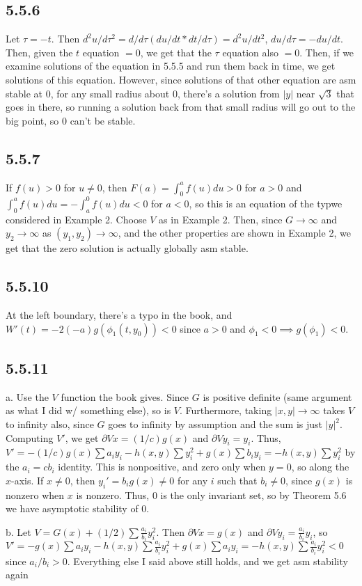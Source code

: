 \documentclass{article}
\begin{document}
\subsection*{5.5.6}
Let $\tau=-t$. Then $d^2u/d\tau^2=d/d\tau(du/dt*dt/d\tau)=d^2u/dt^2$, $du/d\tau=-du/dt$. Then, given the $t$ equation $=0$, we get that the $\tau$ equation also $=0$. Then, if we examine solutions of the equation in 5.5.5 and run them back in time, we get solutions of this equation. However, since solutions of that other equation are asm stable at $0$, for any small radius about $0$, there's a solution from $|y|$ near $\sqrt{3}$ that goes in there, so running a solution back from that small radius will go out to the big point, so $0$ can't be stable.
\subsection*{5.5.7}
If $f(u)>0$ for $u\neq0$, then $F(a)=\int_0^af(u)du>0$ for $a>0$ and $\int_0^af(u)du=-\int_a^0f(u)du<0$ for $a<0$, so this is an equation of the typwe considered in Example 2. Choose $V$ as in Example 2. Then, since $G\to\infty$ and $y_2\to\infty$ as $(y_1,y_2)\to\infty$, and the other properties are shown in Example 2, we get that the zero solution is actually globally asm stable.
\subsection*{5.5.10}
At the left boundary, there's a typo in the book, and $W'(t)=-2(-a)g(\phi_1(t,y_0))<0$ since $a>0$ and $\phi_1<0\implies g(\phi_1)<0$.
\subsection*{5.5.11}
a. Use the $V$ function the book gives. Since $G$ is positive definite (same argument as what I did w/ something else), so is $V$. Furthermore, taking $|x,y|\to\infty$ takes $V$ to infinity also, since $G$ goes to infinity by assumption and the sum is just $|y|^2$. Computing $V'$, we get $\partial{V}{x}=(1/c)g(x)$ and $\partial{V}{y_i}=y_i$. Thus, $V'=-(1/c)g(x)\sum a_iy_i-h(x,y)\sum y_i^2+g(x)\sum b_iy_i=-h(x,y)\sum y_i^2$ by the $a_i=cb_i$ identity. This is nonpositive, and zero only when $y=0$, so along the $x$-axis. If $x\neq0$, then $y_i'=b_ig(x)\neq0$ for any $i$ such that $b_i\neq0$, since $g(x)$ is nonzero when $x$ is nonzero. Thus, $0$ is the only invariant set, so by Theorem 5.6 we have asymptotic stability of $0$.

b. Let $V=G(x)+(1/2)\sum\frac{a_i}{b_i}y_i^2$. Then $\partial{V}{x}=g(x)$ and $\partial{V}{y_i}=\frac{a_i}{b_i}y_i$, so $V'=-g(x)\sum a_iy_i-h(x,y)\sum\frac{a_i}{b_i}y_i^2+g(x)\sum a_iy_i=-h(x,y)\sum\frac{a_i}{b_i}y_i^2<0$ since $a_i/b_i>0$. Everything else I said above still holds, and we get asm stability again
\end{document}
